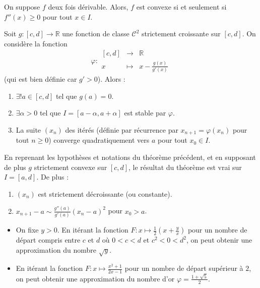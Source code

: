   \begin{proposition}
    On suppose $f$ deux fois dérivable. Alors, $f$ est convexe si et seulement si $f''(x) \geq 0$ pour tout $x \in I$.
  \end{proposition}


  \begin{application}
    Soit $g : [c, d] \rightarrow \mathbb{R}$ une fonction de classe $\mathcal{C}^2$ strictement croissante sur $[c, d]$. On considère la fonction
    \[ \varphi :
    \begin{array}{ccc}
      [c, d] &\rightarrow& \mathbb{R} \\
      x &\mapsto& x - \frac{g(x)}{g'(x)}
    \end{array}
    \]
    (qui est bien définie car $g' > 0$). Alors :
    \begin{enumerate}[label=(\roman*)]
      \item $\exists! a \in [c, d]$ tel que $g(a) = 0$.
      \item $\exists \alpha > 0$ tel que $I = [a - \alpha, a + \alpha]$ est stable par $\varphi$.
      \item La suite $(x_n)$ des itérés (définie par récurrence par $x_{n+1} = \varphi(x_n)$ pour tout $n \geq 0$) converge quadratiquement vers $a$ pour tout $x_0 \in I$.
    \end{enumerate}
  \end{application}

  \begin{corollary}
    En reprenant les hypothèses et notations du théorème précédent, et en supposant de plus $g$ strictement convexe sur $[c, d]$, le résultat du théorème est vrai sur $I = [a, d]$. De plus :
    \begin{enumerate}[label=(\roman*)]
      \item $(x_n)$ est strictement décroissante (ou constante).
      \item $x_{n+1} - a \sim \frac{g''(a)}{g'(a)} (x_n - a)^2$ pour $x_0 > a$.
    \end{enumerate}
  \end{corollary}

  \begin{example}
    \begin{itemize}
      \item On fixe $y > 0$. En itérant la fonction $F : x \mapsto \frac{1}{2} \left( x + \frac{y}{x} \right)$ pour un nombre de départ compris entre $c$ et $d$ où $0 < c < d$ et $c^2 < 0 < d^2$, on peut obtenir une approximation du nombre $\sqrt{y}$.
      \item En itérant la fonction $F : x \mapsto \frac{x^2+1}{2x-1}$ pour un nombre de départ supérieur à $2$, on peut obtenir une approximation du nombre d'or $\varphi = \frac{1+\sqrt{5}}{2}$.
    \end{itemize}
  \end{example}

